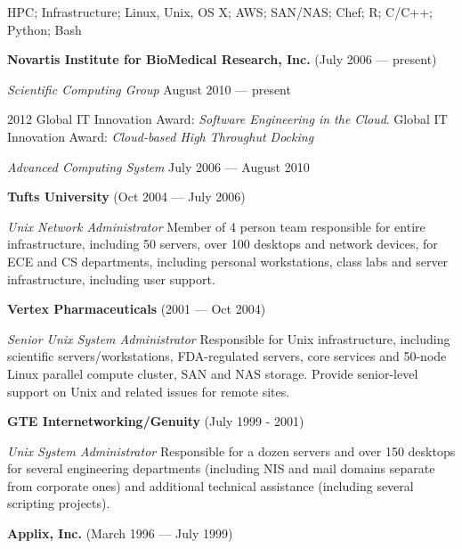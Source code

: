 \documentclass[11pt,article,oneside]{memoir}
\begin{document}
\medskip

\reversemarginpar

\bigskip


\ind HPC; Infrastructure; Linux, Unix, OS X; AWS; SAN/NAS; Chef; R; C/C++; Python; Bash

\bigskip

{}

\ind \textbf{Novartis Institute for BioMedical Research, Inc.} (July 2006 --- present)

\ind \textit{Scientific Computing Group} August 2010 --- present

\ind \hspace{0.35in} \footnotesize 2012 Global IT Innovation Award: \textit{Software Engineering in the Cloud}. Global IT Innovation Award: \textit{Cloud-based High Throughut Docking} \normalsize \vspace{0.05in}

\ind \textit{Advanced Computing System} July 2006 --- August 2010

\ind \textbf{Tufts University} (Oct 2004 --- July 2006)

\ind \textit{Unix Network Administrator} Member of 4 person team responsible for entire infrastructure, including 50 servers, over 100 desktops and network devices, for ECE and CS departments, including personal workstations, class labs and server infrastructure, including user support.

\ind \textbf{Vertex Pharmaceuticals} (2001 --- Oct 2004)

\ind \textit{Senior Unix System Administrator} Responsible for Unix infrastructure, including scientific servers/workstations, FDA-regulated servers, core services and 50-node Linux parallel compute cluster, SAN and NAS storage. Provide senior-level support on Unix and related issues for remote sites.

\ind \textbf{GTE Internetworking/Genuity} (July 1999 - 2001)

\ind \textit{Unix System Administrator} Responsible for a dozen servers and over 150 desktops for several engineering departments (including NIS and mail domains separate from corporate ones) and additional technical assistance (including several scripting projects).

\ind \textbf{Applix, Inc.} (March 1996 --- July 1999)
\end{document}
